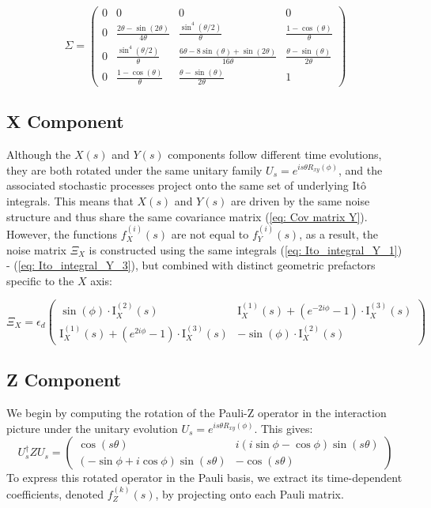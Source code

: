 \documentclass[9pt,a4paper,twocolumn,twoside]{tau-class/tau}
\begin{document}
\begin{equation}
\Sigma =
\begin{pmatrix}
0 & 0 & 0 & 0 \\
0 & \frac{2\theta - \sin(2\theta)}{4\theta} & \frac{\sin^4(\theta/2)}{\theta} & \frac{1 - \cos(\theta)}{\theta} \\
0 & \frac{\sin^4(\theta/2)}{\theta} & \frac{6\theta - 8\sin(\theta) + \sin(2\theta)}{16\theta} & \frac{\theta - \sin(\theta)}{2\theta} \\
0 & \frac{1 - \cos(\theta)}{\theta} & \frac{\theta - \sin(\theta)}{2\theta} & 1
\end{pmatrix}
\label{eq: Cov matrix Y}
\end{equation}

\subsection{X Component}
Although the $X(s)$ and $Y(s)$ components follow different time evolutions, they are both rotated under the same unitary family $U_s = e^{is\theta R_{xy}(\phi)}$, and the associated stochastic processes project onto the same set of underlying Itô integrals. This means that $X(s)$ and $Y(s)$ are driven by the same noise structure and thus share the same covariance matrix (\ref{eq: Cov matrix Y}). However, the functions $f_X^{(i)}(s)$ are not equal to $f_Y^{(i)}(s)$, as a result, the noise matrix $\Xi_X$ is constructed using the same integrals (\ref{eq: Ito_integral_Y_1}) - (\ref{eq: Ito_integral_Y_3}), but combined with distinct geometric prefactors specific to the $X$ axis:

\begin{equation}
    \Xi_X = \epsilon_d \begin{pmatrix}
\sin(\phi) \cdot \text{I}_X^{(2)}(s) & \text{I}_X^{(1)}(s) + (e^{-2i\phi} - 1) \cdot \text{I}_X^{(3)}(s) \\
\text{I}_X^{(1)}(s) + (e^{2i\phi} - 1) \cdot \text{I}_X^{(3)}(s) & -\sin(\phi) \cdot \text{I}_X^{(2)}(s)
\end{pmatrix}
\label{depolariziong noise X}
\end{equation} 
\subsection{Z Component}
We begin by computing the rotation of the Pauli-Z operator in the interaction picture under the unitary evolution \( U_s = e^{is\theta R_{xy}(\phi)} \). This gives:
\begin{equation}
        U_s^\dagger Z U_s = 
    \begin{pmatrix}
\cos(s\theta) & i(i\sin\phi - \cos\phi) \sin\left(s\theta\right) \\
(-\sin\phi + i\cos\phi) \sin\left(s\theta\right) & -\cos(s\theta)
\end{pmatrix}
\label{eq: UZU}
\end{equation}
To express this rotated operator in the Pauli basis, we extract its time-dependent coefficients, denoted \( f_Z^{(k)}(s) \), by projecting onto each Pauli matrix.
\end{document}
